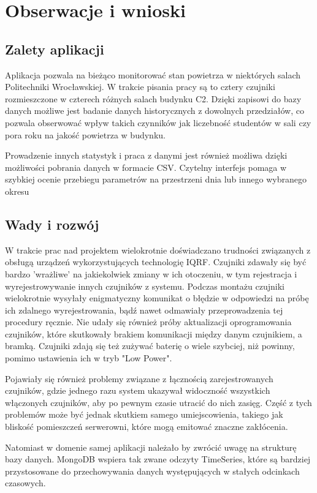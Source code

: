\section{Obserwacje i wnioski}

\subsection{Zalety aplikacji}

Aplikacja pozwala na bieżąco monitorować stan powietrza w niektórych salach Politechniki Wrocławskiej. W trakcie pisania pracy są to
cztery czujniki rozmieszczone w czterech różnych salach budynku C2. Dzięki zapisowi do bazy danych możliwe jest badanie danych historycznych z dowolnych
przedziałów, co pozwala obserwować wpływ takich czynników jak liczebność studentów w sali czy pora roku na jakość powietrza w budynku.

Prowadzenie innych statystyk i praca z danymi jest również możliwa dzięki możliwości pobrania danych w formacie CSV. Czytelny interfejs pomaga w 
szybkiej ocenie przebiegu parametrów na przestrzeni dnia lub innego wybranego okresu

\subsection{Wady i rozwój}

W trakcie prac nad projektem wielokrotnie doświadczano trudności związanych z obsługą urządzeń wykorzystujących technologię IQRF. Czujniki zdawały się
być bardzo 'wrażliwe' na jakiekolwiek zmiany w ich otoczeniu, w tym rejestracja i wyrejestrowywanie innych czujników z systemu. Podczas montażu
czujniki wielokrotnie wysyłały enigmatyczny komunikat o błędzie w odpowiedzi na próbę ich zdalnego wyrejestrowania, bądź nawet odmawiały
przeprowadzenia tej procedury ręcznie. 
Nie udały się również próby aktualizacji oprogramowania czujników, które skutkowały brakiem komunikacji między danym czujnikiem, a bramką. 
Czujniki zdają się też zużywać baterię o wiele szybciej, niż powinny, pomimo ustawienia ich w tryb "Low Power".

Pojawiały się również problemy związane z łącznością zarejestrowanych czujników, gdzie jednego razu system ukazywał widoczność wszystkich włączonych
czujników, aby po pewnym czasie utracić do nich zasięg. Część z tych problemów może być jednak skutkiem samego umiejscowienia, takiego jak bliskość 
pomieszczeń serwerowni, które mogą emitować znaczne zakłócenia.

Natomiast w domenie samej aplikacji należało by zwrócić uwagę na strukturę bazy danych. MongoDB wspiera tak zwane odczyty TimeSeries, które są
bardziej przystosowane do przechowywania danych występujących w stałych odcinkach czasowych.

